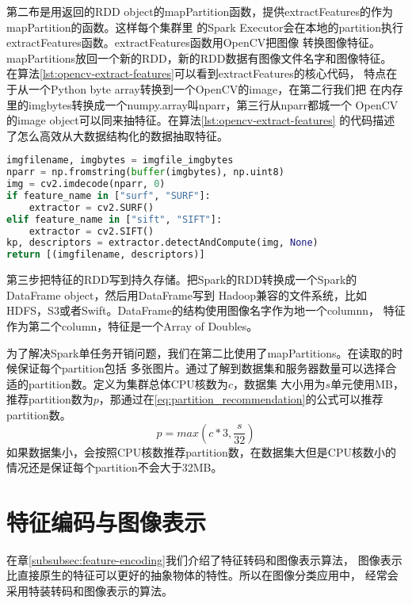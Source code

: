 第二布是用返回的RDD object的mapPartition函数，提供extractFeatures的作为mapPartition的函数。这样每个集群里
的Spark Executor会在本地的partition执行extractFeatures函数。extractFeatures函数用OpenCV把图像
转换图像特征。mapPartitions放回一个新的RDD，新的RDD数据有图像文件名字和图像特征。
在算法\ref{lst:opencv-extract-features}可以看到extractFeatures的核心代码，
特点在于从一个Python byte array转换到一个OpenCV的image，在第二行我们把
在内存里的imgbytes转换成一个numpy.array叫nparr，第三行从nparr都城一个
OpenCV的image object可以同来抽特征。在算法\ref{lst:opencv-extract-features}
的代码描述了怎么高效从大数据结构化的数据抽取特征。
\begin{lstlisting}[language=Python,
                   basicstyle=\small,
                   showstringspaces=false,
                   caption={OpenCV从内存读取图像抽取特征},
                   label={lst:opencv-extract-features}]
imgfilename, imgbytes = imgfile_imgbytes
nparr = np.fromstring(buffer(imgbytes), np.uint8)
img = cv2.imdecode(nparr, 0)
if feature_name in ["surf", "SURF"]:
    extractor = cv2.SURF()
elif feature_name in ["sift", "SIFT"]:
    extractor = cv2.SIFT()
kp, descriptors = extractor.detectAndCompute(img, None)
return [(imgfilename, descriptors)]
\end{lstlisting}

第三步把特征的RDD写到持久存储。把Spark的RDD转换成一个Spark的DataFrame object，然后用DataFrame写到
Hadoop兼容的文件系统，比如HDFS，S3或者Swift。DataFrame的结构使用图像名字作为地一个columnn，
特征作为第二个column，特征是一个Array of Doubles。

为了解决Spark单任务开销问题，我们在第二比使用了mapPartitions。在读取的时候保证每个partition包括
多张图片。通过了解到数据集和服务器数量可以选择合适的partition数。定义为集群总体CPU核数为$c$，数据集
大小用为$s$单元使用MB，推荐partition数为$p$，那通过在\ref{eq:partition_recommendation}的公式可以推荐partition数。
\begin{equation} \label{eq:partition_recommendation}
p = max(c * 3, \frac{s}{32})
\end{equation}
如果数据集小，会按照CPU核数推荐partition数，在数据集大但是CPU核数小的情况还是保证每个partition不会大于32MB。



\section{特征编码与图像表示}
\label{sec:image-representation}
在章\ref{subsubsec:feature-encoding}我们介绍了特征转码和图像表示算法，
图像表示比直接原生的特征可以更好的抽象物体的特性。所以在图像分类应用中，
经常会采用特装转码和图像表示的算法。

